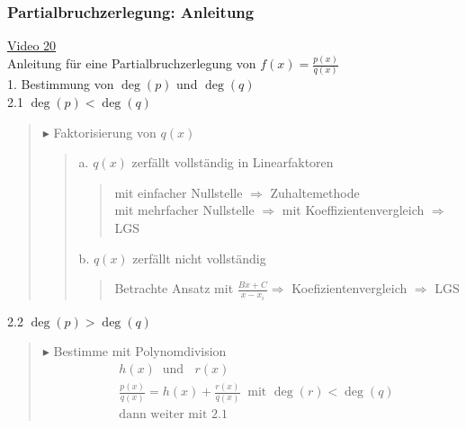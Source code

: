 \subsubsection{Partialbruchzerlegung: Anleitung }
\href{https://youtu.be/ADKDURyGOmg}{Video 20}\\
Anleitung für eine Partialbruchzerlegung von $ f(x)=\frac{p(x)}{q(x)} $\\
1. Bestimmung von $ \deg(p) $ und $ \deg(q) $\vspace*{2mm}\\
2.1 $ \deg(p)< \deg(q) $\\
\begin{quote}
	$\blacktriangleright$ Faktorisierung von $ q(x) $\\
	\begin{quote}
		a. $ q(x) $ zerfällt vollständig in Linearfaktoren\\
		\begin{quote}
			\textbullet \;\;mit einfacher Nullstelle $ \Rightarrow $ Zuhaltemethode\\
			\textbullet \;\;mit mehrfacher Nullstelle $ \Rightarrow $ mit Koeffizientenvergleich $ \Rightarrow $ LGS\\
		\end{quote}
	    b. $ q(x) $ zerfällt nicht vollständig\\
        \begin{quote}
	    Betrachte Ansatz mit $ \frac{Bx+C}{x-x_i} \Rightarrow$ Koefizientenvergleich $ \Rightarrow $ LGS\\
	    \end{quote}
	\end{quote}
\end{quote}
2.2 $ \deg(p)> \deg(q) $\\
\begin{quote}
	$\blacktriangleright$ Bestimme mit Polynomdivision
	 \begin{align*}
	  &h(x) \;\;\text{und }\;\;r(x)\\
	  &\frac{p(x)}{q(x)}=h(x)+\frac{r(x)}{q(x)}\;\;\text{mit }  \deg(r)<\deg(q) \\
	  &\text{dann weiter mit 2.1 }
	 \end{align*}
	
\end{quote}